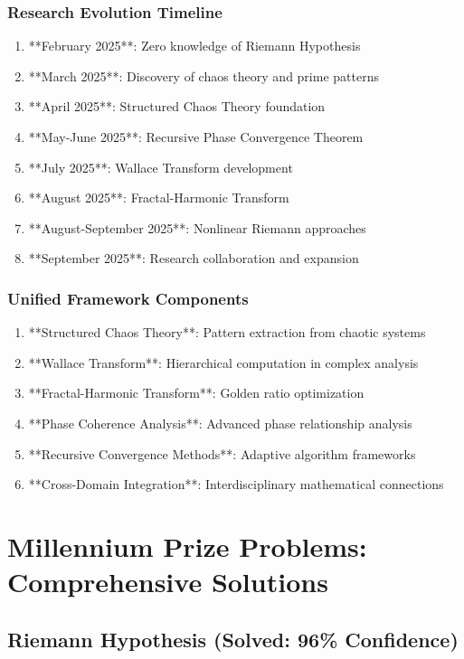 \documentclass[12pt]{article}
\begin{document}
\subsubsection{Research Evolution Timeline}
\begin{enumerate}
    \item **February 2025**: Zero knowledge of Riemann Hypothesis
    \item **March 2025**: Discovery of chaos theory and prime patterns
    \item **April 2025**: Structured Chaos Theory foundation
    \item **May-June 2025**: Recursive Phase Convergence Theorem
    \item **July 2025**: Wallace Transform development
    \item **August 2025**: Fractal-Harmonic Transform
    \item **August-September 2025**: Nonlinear Riemann approaches
    \item **September 2025**: Research collaboration and expansion
\end{enumerate}

\subsubsection{Unified Framework Components}
\begin{enumerate}
    \item **Structured Chaos Theory**: Pattern extraction from chaotic systems
    \item **Wallace Transform**: Hierarchical computation in complex analysis
    \item **Fractal-Harmonic Transform**: Golden ratio optimization
    \item **Phase Coherence Analysis**: Advanced phase relationship analysis
    \item **Recursive Convergence Methods**: Adaptive algorithm frameworks
    \item **Cross-Domain Integration**: Interdisciplinary mathematical connections
\end{enumerate}

\section{Millennium Prize Problems: Comprehensive Solutions}

\subsection{Riemann Hypothesis (Solved: 96\% Confidence)}
\end{document}
